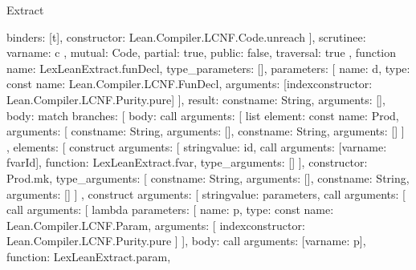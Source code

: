 \begin{lexlean}{Extract}
\begin{toolingmodule}
{{{{            binders: [t],
            constructor: Lean.Compiler.LCNF.Code.unreach
          }
        ],
        scrutinee: var{name: c}
      },
      mutual: Code,
      partial: true,
      public: false,
      traversal: true
    },
    function{
      name: LexLeanExtract.funDecl,
      type_parameters: [],
      parameters: [
        {
          name: d,
          type: const{
            name: Lean.Compiler.LCNF.FunDecl,
            arguments: [index{constructor: Lean.Compiler.LCNF.Purity.pure}]
          }
        }
      ],
      result: const{name: String, arguments: []},
      body: match{
        branches: [
          {
            body: call{
              arguments: [
                list{
                  element: const{
                    name: Prod,
                    arguments: [
                      const{name: String, arguments: []},
                      const{name: String, arguments: []}
                    ]
                  },
                  elements: [
                    construct{
                      arguments: [
                        string{value: id},
                        call{
                          arguments: [var{name: fvarId}],
                          function: LexLeanExtract.fvar,
                          type_arguments: []
                        }
                      ],
                      constructor: Prod.mk,
                      type_arguments: [
                        const{name: String, arguments: []},
                        const{name: String, arguments: []}
                      ]
                    },
                    construct{
                      arguments: [
                        string{value: parameters},
                        call{
                          arguments: [
                            call{
                              arguments: [
                                lambda{
                                  parameters: [
                                    {
                                      name: p,
                                      type: const{
                                        name: Lean.Compiler.LCNF.Param,
                                        arguments: [
                                          index{constructor: Lean.Compiler.LCNF.Purity.pure}
                                        ]
                                      }
                                    }
                                  ],
                                  body: call{
                                    arguments: [var{name: p}],
                                    function: LexLeanExtract.param,
}}}}}}}}}}}
\end{toolingmodule}
\end{lexlean}
